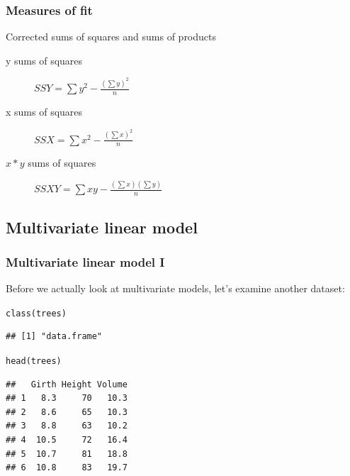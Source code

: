 \documentclass[xcolor=table, xcolor=dvipsnames]{beamer}\usepackage[]{graphicx}\usepackage[]{color}
\makeatletter
\newcommand{\hlstd}[1]{\textcolor[rgb]{0,0,0}{#1}}
\newcommand{\hlkwd}[1]{\textcolor[rgb]{0,0,1}{#1}}
\newenvironment{kframe}{%
 \def\at@end@of@kframe{}%
 \ifinner\ifhmode%
  \def\at@end@of@kframe{\end{minipage}}%
  \begin{minipage}{\columnwidth}%
 \fi\fi%
 \def\FrameCommand##1{\hskip\@totalleftmargin \hskip-\fboxsep
 \colorbox{shadecolor}{##1}\hskip-\fboxsep
     \hskip-\linewidth \hskip-\@totalleftmargin \hskip\columnwidth}%
 \MakeFramed {\advance\hsize-\width
   \@totalleftmargin\z@ \linewidth\hsize
   \@setminipage}}%
 {\par\unskip\endMakeFramed%
 \at@end@of@kframe}
\newenvironment{knitrout}{}{} %
\makeatother
\begin{document}

\begin{frame}[fragile]\frametitle{Measures of fit}
Corrected sums of squares and sums of products
\begin{description}
\item [y sums of squares] \( SSY=\sum y^2 - \frac{(\sum y)^2}{n}\)
\item [x sums of squares] \( SSX=\sum x^2 - \frac{(\sum x)^2}{n}\)
\item [$x*y$ sums of squares] \( SSXY=\sum xy - \frac{(\sum x)(\sum y)}{n}\)
\end{description}
\end{frame}

\subsection{Multivariate linear model}

\begin{frame}[fragile]\frametitle{Multivariate linear model I}
Before we actually look at multivariate models, let's examine another dataset:
\begin{knitrout}
\color{fgcolor}\begin{kframe}
\begin{alltt}
\hlkwd{class}\hlstd{(trees)}
\end{alltt}
\begin{verbatim}
## [1] "data.frame"
\end{verbatim}
\begin{alltt}
\hlkwd{head}\hlstd{(trees)}
\end{alltt}
\begin{verbatim}
##   Girth Height Volume
## 1   8.3     70   10.3
## 2   8.6     65   10.3
## 3   8.8     63   10.2
## 4  10.5     72   16.4
## 5  10.7     81   18.8
## 6  10.8     83   19.7
\end{verbatim}
\end{kframe}
\end{knitrout}
\end{frame}

\end{document}
